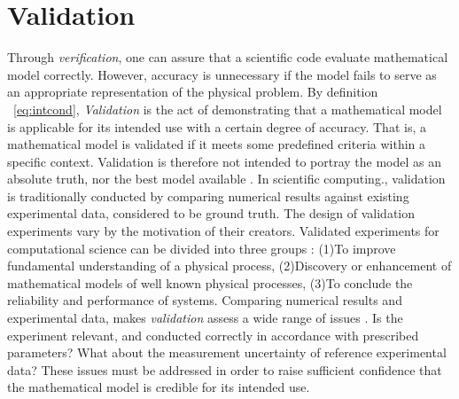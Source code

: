 \section{Validation}
Through \textit{verification}, one can assure that a scientific code evaluate mathematical model correctly. However, accuracy is unnecessary if the model fails to serve as an appropriate representation of the physical problem. By definition ~\ref{eq:intcond}, \textit{Validation} is the act of demonstrating that a mathematical model is applicable for its intended use with a certain degree of accuracy. That is, a mathematical model is validated if it meets some predefined criteria within a specific context. Validation is therefore not intended to portray the model as an absolute truth, nor the best model available \cite{Rykiel1996}. In scientific computing., validation is traditionally conducted by comparing numerical results against existing experimental data, considered to be ground truth. The design of validation experiments vary by the motivation of their creators. Validated experiments for computational science can be divided into three groups \cite{Sommerville2006}: (1)To improve fundamental understanding of a physical process, (2)Discovery or enhancement of mathematical models of well known physical processes, (3)To conclude the reliability and performance of systems. Comparing numerical results and experimental data, makes \textit{validation} assess a wide range of issues \cite{Sommerville2006}. Is the experiment relevant, and  conducted correctly in accordance with prescribed parameters? What about the measurement uncertainty of reference experimental data? These issues  must be addressed in order to raise sufficient confidence that the mathematical model is credible for its intended use. \\
 \newpage
 
